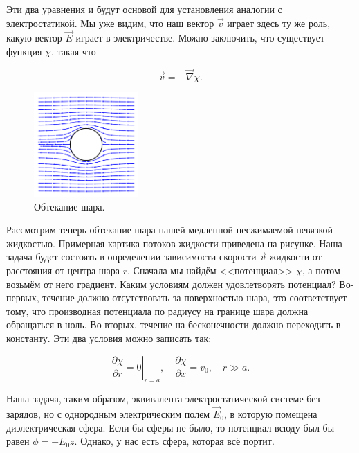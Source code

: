 \documentclass[11pt,a4paper]{article}
\numberwithin{equation}{section}
\newcommand{\pt}{\partial}
\newcommand{\vn}{\vec{\nabla}}
\begin{document}
Эти два уравнения и будут основой для установления аналогии с
электростатикой. Мы уже видим, что наш вектор $\vec{v}$ играет здесь
ту же роль, какую вектор $\vec{E}$ играет в электричестве. Можно
заключить, что существует функция $\chi$, такая что

\begin{equation}
  \label{eq:hydro_4}
  \vec{v} = - \vn \chi.
\end{equation}


\begin{figure}
  \vspace{-1cm}
  \begin{center}
    \includegraphics[width=4cm,height=4cm]{fluid_lines.pdf}
  \end{center}
  \vspace{-0.7cm}
  \caption{Обтекание шара.}
  \label{fig:hydro}
\end{figure}


Рассмотрим теперь обтекание шара нашей медленной несжимаемой невязкой
жидкостью. Примерная картика потоков жидкости приведена на
рисунке. Наша задача будет состоять в определении зависимости скорости
$\vec{v}$ жидкости от расстояния от центра шара $r$. Сначала мы найдём
<<потенциал>> $\chi$, а потом возьмём от него градиент. Каким условиям
должен удовлетворять потенциал? Во-первых, течение должно
отсутствовать за поверхностью шара, это соответствует тому, что
производная потенциала по радиусу на границе шара должна обращаться в
ноль. Во-вторых, течение на бесконечности должно переходить в
константу. Эти два условия можно записать так:

\begin{equation}
  \label{eq:hydro_bc}
  \left.\frac{\pt \chi}{\pt r} = 0\right|_{r=a}, \quad \frac{\pt
    \chi}{\pt x} = v_0, \quad r \gg a.
\end{equation}

Наша задача, таким образом, эквивалента электростатической системе без
зарядов, но с однородным электрическим полем $\vec{E}_0$, в которую
помещена диэлектрическая сфера. Если бы сферы не было, то потенциал
всюду был бы равен $\phi = - E_0 z$. Однако, у нас есть сфера, которая
всё портит. 
\end{document}
